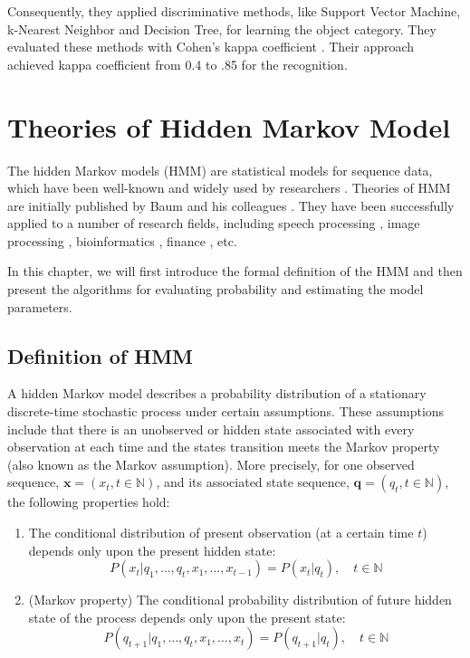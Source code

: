 \documentclass[12pt,final,twoside]{report}
\theoremstyle{plain}
\theoremstyle{definition}
\theoremstyle{remark}
\begin{document}
Consequently, they applied discriminative methods, like Support Vector Machine, k-Nearest Neighbor and Decision Tree, for learning the object category. They evaluated these methods with Cohen's kappa coefficient \cite{cohen_coefficient_1960}. Their approach achieved kappa coefficient from 0.4 to .85 for the recognition.

\cleardoublepage
\chapter{Theories of Hidden Markov Model}
The hidden Markov models (HMM) are statistical models for sequence data, which have been well-known and widely used by researchers \cite{rabiner_tutorial_1989, rabiner_fundamentals_1993}. Theories of HMM are initially published by Baum and his colleagues \cite{baum_statistical_1966, baum_maximization_1970}. They have been successfully applied to a number of research fields, including speech processing \cite{baker_dragon_1975, rabiner_fundamentals_1993}, image processing \cite{chen_off-line_1994}, bioinformatics \cite{koski_hidden_2001}, finance \cite{bhar_hidden_2004}, etc.

In this chapter, we will first introduce the formal definition of the HMM and then present the algorithms for evaluating probability and estimating the model parameters.

\section{Definition of HMM}
A hidden Markov model describes a probability distribution of a stationary discrete-time stochastic process under certain assumptions. These assumptions include that there is an unobserved or hidden state associated with every observation at each time and the states transition meets the Markov property (also known as the Markov assumption). More precisely, for one observed sequence, $\mathbf{x}=(x_t, t \in \mathbb{N})$, and its associated state sequence, $\mathbf{q}=(q_t, t \in \mathbb{N})$, the following properties hold:

\begin{enumerate}
  \item The conditional distribution of present observation (at a certain time $t$) depends only upon the present hidden state:
  \begin{equation} \label{eq:ob_prob}
    P(x_t|q_1, \dots, q_t, x_1, \dots, x_{t-1}) = P(x_t|q_t),\quad t \in \mathbb{N} 
  \end{equation}
  \item (Markov property) The conditional probability distribution of future hidden state of the process depends only upon the present state:
  \begin{equation} \label{eq:markov_prop}
    P(q_{t+1}|q_1, \dots, q_t, x_1, \dots, x_t) = P(q_{t+1}|q_t),\quad t \in \mathbb{N}
  \end{equation}
\end{enumerate}
\end{document}
